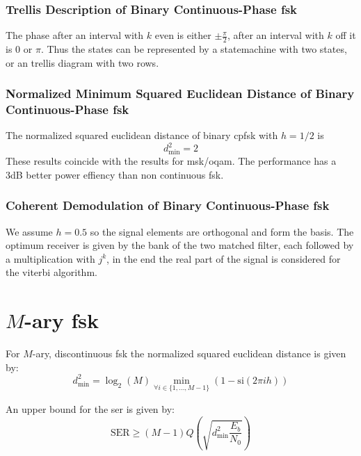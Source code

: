 \subsubsection{Trellis Description of Binary Continuous-Phase \acl{fsk}}
The phase after an interval with $k$ even is either $\pm \frac{\pi}{2}$, after
an interval with $k$ off it is $0$ or $\pi$. Thus the states can be represented by
a statemachine with two states, or an trellis diagram with two rows.

\subsubsection{Normalized Minimum Squared Euclidean Distance of Binary Continuous-Phase
    \acl{fsk}}
The normalized squared euclidean distance of binary \ac{cpfsk} with $h=1/2$ is
\begin{equation}
    d_\text{min}^2 = 2
\end{equation}
These results coincide with the results for \ac{msk}/\ac{oqam}. The performance has a 
3dB better power effiency than non continuous \ac{fsk}.

\subsubsection{Coherent Demodulation of Binary Continuous-Phase \acl{fsk}}
We assume $h=0.5$ so the signal elements are orthogonal and form the basis.
The optimum receiver is given by the bank of the two matched filter, each followed
by a multiplication with $j^k$, in the end the real part of the signal is considered
for the viterbi algorithm.

\section{$M$-ary \acl{fsk}}
For $M$-ary, discontinuous \ac{fsk} the normalized squared euclidean distance is given by:
\begin{equation}
    d_\text{min}^2 = \log_2(M) \min_{\forall i \in \{1, \ldots, M-1\}}
        \left(1 - \text{si}(2 \pi i h)\right)
\end{equation}

An upper bound for the \ac{ser} is given by:
\begin{equation}
    \text{SER} \geq (M-1) Q\left(\sqrt{d_\text{min}^2 \frac{E_b}{N_0}}\right)
\end{equation}
